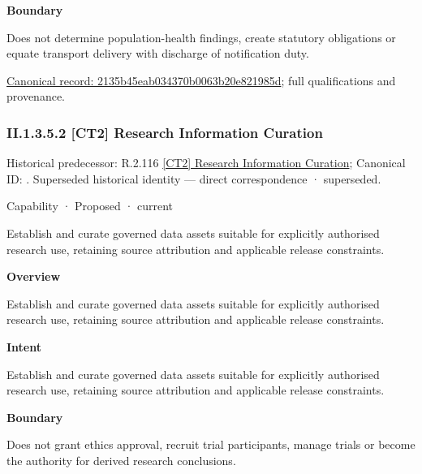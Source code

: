 \textbf{Boundary}



Does not determine population-health findings, create statutory obligations or equate transport delivery with discharge of notification duty.


{\footnotesize \href{../../../../continuum/strategy/capability/2135b45eab034370b0063b20e821985d.md}{Canonical record: 2135b45eab034370b0063b20e821985d}; full qualifications and provenance.}\par
\subsubsection*{II.1.3.5.2 [CT2] Research Information Curation}
\label{navigation:II.1.3.5.2}

{\small Historical predecessor: R.2.116 \hyperref[element:11203b9c80964a9b96883eeab07f41d5]{[CT2] Research Information Curation}; Canonical ID: \texttt{}. Superseded historical identity — direct correspondence · superseded.}\par
\label{element:4f5b8cec90324c2989cdc30e80bc8cb9}
{\small Capability · Proposed · current}\par

Establish and curate governed data assets suitable for explicitly authorised research use, retaining source attribution and applicable release constraints.



\textbf{Overview}



Establish and curate governed data assets suitable for explicitly authorised research use, retaining source attribution and applicable release constraints.



\textbf{Intent}



Establish and curate governed data assets suitable for explicitly authorised research use, retaining source attribution and applicable release constraints.



\textbf{Boundary}



Does not grant ethics approval, recruit trial participants, manage trials or become the authority for derived research conclusions.


